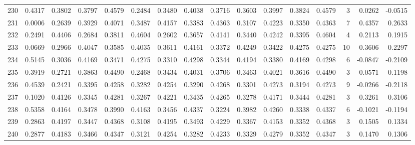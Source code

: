 \begin{tabular}{lrrrrrrrrrrrrrrr}
230 &      0.4317 &  0.3802 &  0.3797 &  0.4579 &  0.2484 &  0.3480 &  0.4038 &  0.3716 &  0.3603 &  0.3997 &   0.3824 &     0.4579 &      3 &                    0.0262 &                    -0.0515 \\
231 &      0.0006 &  0.2639 &  0.3929 &  0.4071 &  0.3487 &  0.4157 &  0.3383 &  0.4363 &  0.3107 &  0.4223 &   0.3350 &     0.4363 &      7 &                    0.4357 &                     0.2633 \\
232 &      0.2491 &  0.4406 &  0.2684 &  0.3811 &  0.4604 &  0.2602 &  0.3657 &  0.4141 &  0.3440 &  0.4242 &   0.3395 &     0.4604 &      4 &                    0.2113 &                     0.1915 \\
233 &      0.0669 &  0.2966 &  0.4047 &  0.3585 &  0.4035 &  0.3611 &  0.4161 &  0.3372 &  0.4249 &  0.3422 &   0.4275 &     0.4275 &     10 &                    0.3606 &                     0.2297 \\
234 &      0.5145 &  0.3036 &  0.4169 &  0.3471 &  0.4275 &  0.3310 &  0.4298 &  0.3344 &  0.4194 &  0.3380 &   0.4169 &     0.4298 &      6 &                   -0.0847 &                    -0.2109 \\
235 &      0.3919 &  0.2721 &  0.3863 &  0.4490 &  0.2468 &  0.3434 &  0.4031 &  0.3706 &  0.3463 &  0.4021 &   0.3616 &     0.4490 &      3 &                    0.0571 &                    -0.1198 \\
236 &      0.4539 &  0.2421 &  0.3395 &  0.4258 &  0.3282 &  0.4254 &  0.3290 &  0.4268 &  0.3301 &  0.4273 &   0.3194 &     0.4273 &      9 &                   -0.0266 &                    -0.2118 \\
237 &      0.1020 &  0.4126 &  0.3345 &  0.4281 &  0.3267 &  0.4221 &  0.3435 &  0.4265 &  0.3278 &  0.4171 &   0.3444 &     0.4281 &      3 &                    0.3261 &                     0.3106 \\
238 &      0.5358 &  0.4164 &  0.3478 &  0.3990 &  0.4163 &  0.3456 &  0.4337 &  0.3224 &  0.3982 &  0.4260 &   0.3338 &     0.4337 &      6 &                   -0.1021 &                    -0.1194 \\
239 &      0.2863 &  0.4197 &  0.3447 &  0.4368 &  0.3108 &  0.4195 &  0.3493 &  0.4229 &  0.3367 &  0.4153 &   0.3352 &     0.4368 &      3 &                    0.1505 &                     0.1334 \\
240 &      0.2877 &  0.4183 &  0.3466 &  0.4347 &  0.3121 &  0.4254 &  0.3282 &  0.4233 &  0.3329 &  0.4279 &   0.3352 &     0.4347 &      3 &                    0.1470 &                     0.1306 \\

\end{tabular}
